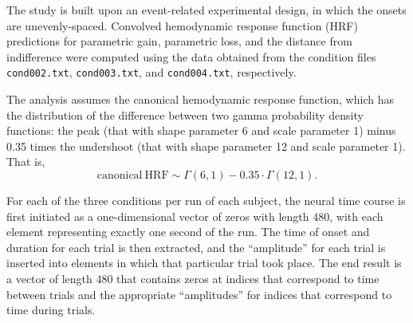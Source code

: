 
\par The study is built upon an event-related experimental design, in which the
onsets are unevenly-spaced. Convolved hemodynamic response function (HRF)
predictions for parametric gain, parametric loss, and the distance from
indifference were computed using the data obtained from the condition files
\texttt{cond002.txt}, \texttt{cond003.txt}, and \texttt{cond004.txt},
respectively.

\par \indent The analysis assumes the canonical hemodynamic response function,
which has the distribution of the difference between two gamma probability
density functions: the peak (that with shape parameter 6 and scale parameter 1)
minus 0.35 times the undershoot (that with shape parameter 12 and scale
parameter 1). That is,
\[
\mathrm{canonical \ HRF} \sim \Gamma \left( 6 , 1 \right) - 0.35 \cdot \Gamma \left(
12 , 1 \right).
\]

\par \indent For each of the three conditions per run of each subject, the
neural time course is first initiated as a one-dimensional vector of zeros with
length 480, with each element representing exactly one second of the run. The
time of onset and duration for each trial is then extracted, and the
``amplitude'' for each trial is inserted into elements in which that particular
trial took place. The end result is a vector of length 480 that contains zeros
at indices that correspond to time between trials and the appropriate
``amplitudes'' for indices that correspond to time during trials.
